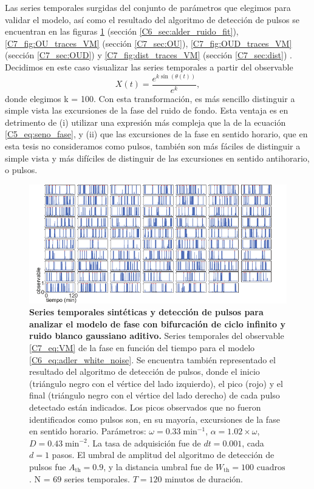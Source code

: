 \documentclass[./main.tex]{subfiles}
\begin{document}
\begin{subappendices}
Las series temporales surgidas del conjunto de parámetros que elegimos para validar el modelo, así como el resultado del algoritmo de detección de pulsos se encuentran en las figuras \ref{C6_ap_fig:traces_evaluation} (sección \ref{C6_sec:alder_ruido_fit}), \ref{C7_fig:OU_traces_VM} (sección \ref{C7_sec:OU}), \ref{C7_fig:OUD_traces_VM} (sección \ref{C7_sec:OUD}) y \ref{C7_fig:dist_traces_VM} (sección \ref{C7_sec:dist}) . Decidimos en este caso visualizar las series temporales a partir del observable 
\begin{equation}
    X(t) = \frac{e^{k\sin{(\theta(t))}}}{e^{k}},
    \label{C7_eq:VM}
\end{equation}
donde elegimos k = 100. Con esta transformación, es más sencillo distinguir a simple vista las excursiones de la fase del ruido de fondo. Esta ventaja es en detrimento de (i) utilizar una expresión más compleja que la de la ecuación \ref{C5_eq:seno_fase}, y (ii) que las excursiones de la fase en sentido horario, que en esta tesis no consideramos como pulsos, también son más fáciles de distinguir a simple vista y más difíciles de distinguir de las excursiones en sentido antihorario, o pulsos. 


\begin{figure}
    \centering
    \includegraphics[width=1\columnwidth]{figures/chapter6/C6_traces_for_evaluation_VM.pdf} 
    \caption{\textbf{Series temporales sintéticas y detección de pulsos para analizar el modelo de fase con bifurcación de ciclo infinito y ruido blanco gaussiano aditivo.} Series temporales del observable \ref{C7_eq:VM} de la fase en función del tiempo para el modelo \ref{C6_eq:adler_white_noise}. Se encuentra también representado el resultado del algoritmo de detección de pulsos, donde el inicio (triángulo negro con el vértice del lado izquierdo), el pico (rojo) y el final (triángulo negro con el vértice del lado derecho) de cada pulso detectado están indicados. Los picos observados que no fueron identificados como pulsos son, en su mayoría, excursiones de la fase en sentido horario. Parámetros:  $\omega = 0.33\;\text{min}^{-1}$, $\alpha = 1.02 \times \omega$, $ D = 0.43 \;\text{min}^{-2}$. La tasa de adquisición fue de $dt = 0.001$, cada $d = 1$ pasos. El umbral de amplitud del algoritmo de detección de pulsos fue $A_{\text{th}} = 0.9$, y la distancia umbral fue de $W_{\text{th}} = 100\text{ cuadros}$. N = $69$ series temporales. $T = 120$ minutos de duración.}
    \label{C6_ap_fig:traces_evaluation}
\end{figure}



\end{subappendices}
\end{document}
